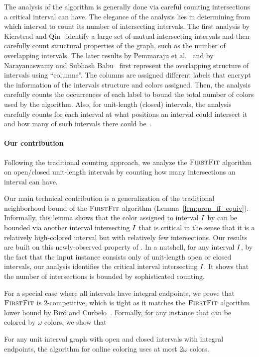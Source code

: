 The analysis of the \ff{} algorithm is generally done via careful counting intersections a critical interval can have.
The elegance of the analysis lies in determining from which interval to count its number of intersecting intervals. 
The first analysis by Kierstead and Qin~\cite{DBLP:journals/siamdm/Kierstead88, DBLP:journals/dm/KiersteadQ95} identify a large set of mutual-intersecting intervals and then carefully count structural properties of the graph, such as the number of overlapping intervals.
The later results by Pemmaraju et al.~\cite{DBLP:journals/talg/PemmarajuRV11} and by Narayanaswamy and Subhash Babu~\cite{DBLP:journals/order/NarayanaswamyB08} first represent the overlapping structure of intervals using ``columns''.
The columns are assigned different labels that encrypt the information of the intervals structure and colors assigned.
Then, the analysis carefully counts the occurrences of each label to bound the total number of colors used by the \ff{} algorithm.
Also, for unit-length (closed) intervals, the analysis carefully counts for each interval at what positions an interval could intersect it and how many of such intervals there could be~\cite{DBLP:journals/ita/ChrobakS88, DBLP:conf/icalp/EpsteinL05}.

\paragraph*{Our contribution}
Following the traditional counting approach, we analyze the $\textsc{FirstFit}$ algorithm on open/closed unit-length intervals by counting how many intersections an interval can have.

Our main technical contribution is a generalization of the traditional neighborhood bound of the $\textsc{FirstFit}$ algorithm (Lemma~\ref{lem:prop_ff_equiv}). 
Informally, this lemma shows that the color assigned to interval $I$ by \ff can be bounded via another interval intersecting $I$ that is critical in the sense that it is a relatively high-colored interval but with relatively few intersections.
Our results are built on this newly-observed property of \ff. 
In a nutshell, for any interval $I$, by the fact that the input instance consists only of unit-length open or closed intervals, our analysis identifies the critical interval intersecting $I$. It shows that the number of intersections is bounded by sophisticated counting. 

For a special case where all intervals have integral endpoints, we prove that $\textsc{FirstFit}$ is $2$-competitive, which is tight as it matches the $\textsc{FirstFit}$ algorithm lower bound by Bir\'{o} and Curbelo~\cite{Curbelo}.
Formally, for any instance that can be colored by $\omega$ colors, we show that
\begin{theorem}
    \label{thm:integral}
    For any unit interval graph with open and closed intervals with integral endpoints, the \ff{} algorithm for online coloring uses at most $2\omega$ colors.
\end{theorem}

